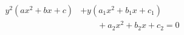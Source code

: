 \begin{proposition}\label{eq:142}
\[
    \begin{aligned}y^2(ax^2+bx+c)&+y(a_1x^2+b_1x+c_1)\\&\qquad+a_2x^2+b_2x+c_2=0\end{aligned}
\]
\end{proposition}
